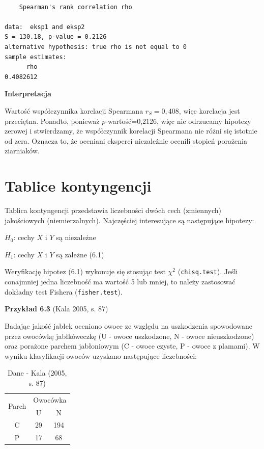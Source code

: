 \documentclass[12pt,B5paper,]{book}
\begin{document}
\begin{verbatim}

    Spearman's rank correlation rho

data:  eksp1 and eksp2
S = 130.18, p-value = 0.2126
alternative hypothesis: true rho is not equal to 0
sample estimates:
      rho 
0.4082612 
\end{verbatim}

\vspace{0.8cm} \textbf{Interpretacja}

Wartość współczynnika korelacji Spearmana \(r_S=0,408\), więc korelacja
jest przeciętna. Ponadto, ponieważ \(p\)-wartość=0,2126, więc nie
odrzucamy hipotezy zerowej i stwierdzamy, że współczynnik korelacji
Spearmana nie różni się istotnie od zera. Oznacza to, że oceniani
eksperci niezależnie ocenili stopień porażenia ziarniaków.

\section{Tablice kontyngencji}\label{tablice-kontyngencji}

Tablica kontyngencji przedstawia liczebności dwóch cech (zmiennych)
jakościowych (niemierzalnych). Najczęściej interesujące są następujące
hipotezy:

\hspace*{5cm} \(H_0\): cechy \(X\) i \(Y\) są niezależne

\hspace*{5cm} \(H_1\): cechy \(X\) i \(Y\) są zależne \hfill (6.1)

Weryfikację hipotez (6.1) wykonuje się stosując test \(\chi^2\)
(\texttt{chisq.test}). Jeśli conajmniej jedna liczebność ma wartość 5
lub mniej, to należy zastosować dokładny test Fishera
(\texttt{fisher.test}).

\vspace{0.8cm} \textbf{Przykład 6.3} (Kala 2005, s. 87)

Badając jakość jabłek oceniono owoce ze względu na uszkodzenia
spowodowane przez owocówkę jabłkóweczkę (U - owoce uszkodzone, N - owoce
nieuszkodzone) oraz porażone parchem jabłoniowym (C - owoce czyste, P -
owoce z plamami). W wyniku klasyfikacji owoców uzyskano następujące
liczebności:

\begin{table}[H]
\centering
\caption{Dane - Kala (2005, s. 87)}
\label{Kala}
\begin{tabular}{ccc}
\hline
\multirow{2}{*}{Parch} & \multicolumn{2}{c}{Owocówka} \\
& U            & N             \\ \hline
C      & 29           & 194           \\
P      & 17           & 68      \\ \hline     
\end{tabular}
\end{table}
\end{document}
